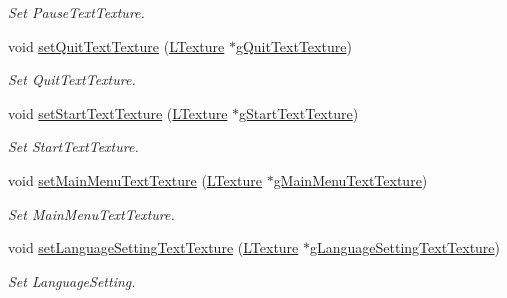 \begin{DoxyCompactItemize}
\begin{DoxyCompactList}\small\item\em Set Pause\+Text\+Texture. \end{DoxyCompactList}\item 
void \mbox{\hyperlink{class_main_menu_a14e87e2809aa8b367ba569d4718772a5}{set\+Quit\+Text\+Texture}} (\mbox{\hyperlink{class_l_texture}{L\+Texture}} $\ast$\mbox{\hyperlink{class_main_menu_a50306a63e4407b75ce154f1581130342}{g\+Quit\+Text\+Texture}})
\begin{DoxyCompactList}\small\item\em Set Quit\+Text\+Texture. \end{DoxyCompactList}\item 
\mbox{\label{class_main_menu_a1ae6b357e3162a17b6e5a1e4ba4d1bf9}} 
void \mbox{\hyperlink{class_main_menu_a1ae6b357e3162a17b6e5a1e4ba4d1bf9}{set\+Start\+Text\+Texture}} (\mbox{\hyperlink{class_l_texture}{L\+Texture}} $\ast$\mbox{\hyperlink{class_main_menu_ad503eaed21ec90d1971ec1577095b7b6}{g\+Start\+Text\+Texture}})
\begin{DoxyCompactList}\small\item\em Set Start\+Text\+Texture. \end{DoxyCompactList}\item 
\mbox{\label{class_main_menu_ae18aeb7308d7d526b5767f962c6d5382}} 
void \mbox{\hyperlink{class_main_menu_ae18aeb7308d7d526b5767f962c6d5382}{set\+Main\+Menu\+Text\+Texture}} (\mbox{\hyperlink{class_l_texture}{L\+Texture}} $\ast$\mbox{\hyperlink{class_main_menu_a443820fab8594cc11e968ce0fe902000}{g\+Main\+Menu\+Text\+Texture}})
\begin{DoxyCompactList}\small\item\em Set Main\+Menu\+Text\+Texture. \end{DoxyCompactList}\item 
\mbox{\label{class_main_menu_a8abfced0f24ddbd177a2ddbddd231d30}} 
void \mbox{\hyperlink{class_main_menu_a8abfced0f24ddbd177a2ddbddd231d30}{set\+Language\+Setting\+Text\+Texture}} (\mbox{\hyperlink{class_l_texture}{L\+Texture}} $\ast$\mbox{\hyperlink{class_main_menu_a5e7d9454fcc85c02a8fb6592126b8a93}{g\+Language\+Setting\+Text\+Texture}})
\begin{DoxyCompactList}\small\item\em Set Language\+Setting. \end{DoxyCompactList}\item 

\end{DoxyCompactItemize}
